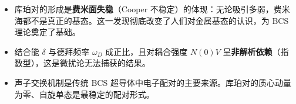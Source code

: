 \begin{insightbox}[物理图像]
\begin{itemize}
    \item 库珀对的形成是\textbf{费米面失稳}（Cooper 不稳定）的体现：无论吸引多弱，费米海都不是真正的基态。这一发现彻底改变了人们对金属基态的认识，为 BCS 理论奠定了基础。
    \item 结合能 $\delta$ 与德拜频率 $\omega_D$ 成正比，且对耦合强度 $N(0)V$ 呈\textbf{非解析依赖}（指数型），这是微扰论无法捕获的结果。
    \item 声子交换机制是传统 BCS 超导体中电子配对的主要来源。库珀对的质心动量为零、自旋单态是最稳定的配对形式。
\end{itemize}
\end{insightbox}
